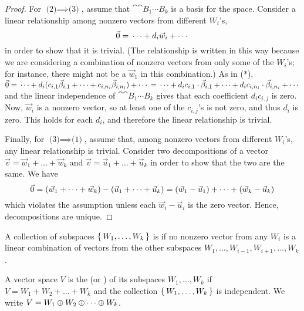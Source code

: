 \begin{proof}
For $\text{(2)}\implies\text{(3)}$,
assume that $\cat{\cat{B_1}{\cdots}}{B_k}$ is a basis for the space.
Consider a linear relationship among nonzero vectors from different
$W_i$'s, 
\begin{equation*}
  \vec{0}=\mbox{}\dots+d_i\vec{w}_i+\cdots\mbox{}
\end{equation*}
in order to show that it is trivial.
(The relationship is written in this way because we are considering a
combination of nonzero vectors from only some of the $W_i$'s; 
for instance, there might not be a $\vec{w}_1$ in this combination.)
As in ($*$),
$
  \vec{0} 
   = \mbox{}\dots
      +d_i(c_{i,1}\vec{\beta}_{i,1}+\dots+c_{i,n_i}\vec{\beta}_{i,n_i})
      +\cdots\mbox{}                                                       
   = \mbox{}\dots
      +d_ic_{i,1}\cdot\vec{\beta}_{i,1}
      +\dots+
      d_ic_{i,n_i}\cdot\vec{\beta}_{i,n_i}
      +\cdots\mbox{}                                                      
$
and the linear independence of $\cat{\cat{B_1}{\cdots}}{B_k}$ gives that each
coefficient $d_ic_{i,j}$ is zero.
Now, $\vec{w}_i$ is a nonzero vector, so at least one of the 
$c_{i,j}$'s is not zero, and thus $d_i$ is zero.
This holds for each $d_i$, and therefore 
the linear relationship is trivial.

Finally, for $\text{(3)}\implies\text{(1)}$,
assume that, among nonzero vectors from different $W_i$'s, any linear
relationship is trivial.
Consider two decompositions of a vector 
$\vec{v}=\vec{w}_1+\dots+\vec{w}_k$ and $\vec{v}=\vec{u}_1+\dots+\vec{u}_k$
in order to show that the two are the same.
We have
\begin{equation*}
  \vec{0}
   =(\vec{w}_1+\dots+\vec{w}_k)
    -(\vec{u}_1+\dots+\vec{u}_k)
   =(\vec{w}_1-\vec{u}_1)+\dots+(\vec{w}_k-\vec{u}_k)
\end{equation*}
which violates the assumption unless each $\vec{w}_i-\vec{u}_i$ is the zero
vector.
Hence, decompositions are unique.
\end{proof}

\begin{definition}
A collection of subspaces \( \mbox{$\{\,W_1,\ldots, W_k\,\}$} \) is
if no nonzero vector from any \( W_i \) is a linear combination of
vectors from the other subspaces \( W_1,\dots, W_{i-1},W_{i+1},\dots, W_k \).
\end{definition}

\begin{definition}
A vector space \( V \) is the
(or ) 
of its subspaces \( W_1,\dots, W_k \) if
\( V=W_1+W_2+\dots +W_k \)
and the collection \( \mbox{$\{\,W_1,\dots, W_k\,\}$} \) is independent.
We write \( V=W_1\oplus W_2\oplus \cdots\oplus W_k \).
\end{definition}

